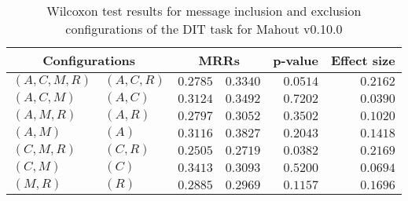 
\begin{table}
\begin{spacing}{1.2}
\centering
\caption{Wilcoxon test results for message inclusion and exclusion configurations of the DIT task for Mahout v0.10.0}
\label{table:versus-wilcox-mahout-dit-message}
\begin{tabular}{ll|rr|rr}
\toprule
      \multicolumn{2}{c|}{Configurations} &          \multicolumn{2}{c|}{MRRs} &       p-value & Effect size \\
\midrule
 $(A,C,M,R)$ &  $(A,C,R)$ & $0.2785$ & $0.3340$ & $0.0514$ &    $0.2162$ \\
   $(A,C,M)$ &    $(A,C)$ & $0.3124$ & $0.3492$ & $0.7202$ &    $0.0390$ \\
   $(A,M,R)$ &    $(A,R)$ & $0.2797$ & $0.3052$ & $0.3502$ &    $0.1020$ \\
     $(A,M)$ &      $(A)$ & $0.3116$ & $0.3827$ & $0.2043$ &    $0.1418$ \\
   $(C,M,R)$ &    $(C,R)$ & $0.2505$ & $0.2719$ & $0.0382$ &    $0.2169$ \\
     $(C,M)$ &      $(C)$ & $0.3413$ & $0.3093$ & $0.5200$ &    $0.0694$ \\
     $(M,R)$ &      $(R)$ & $0.2885$ & $0.2969$ & $0.1157$ &    $0.1696$ \\
\bottomrule
\end{tabular}

\end{spacing}
\end{table}

